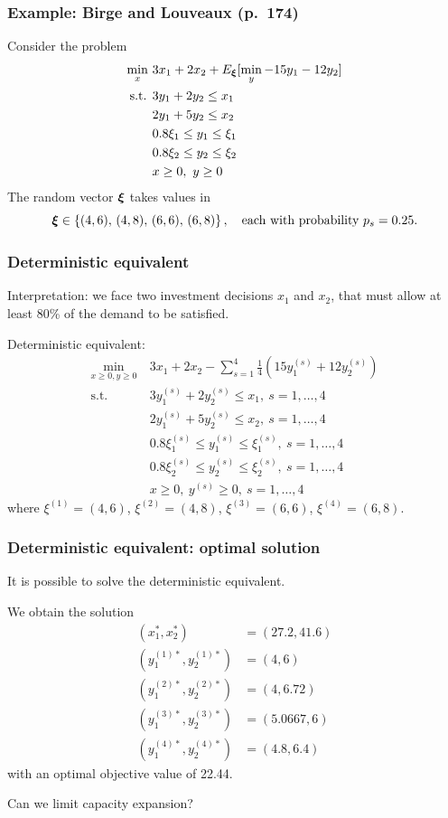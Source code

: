 \documentclass[aspectratio=169]{beamer}
\begin{document}
\begin{frame}
\frametitle{Example: Birge and Louveaux (p.~174)}

\small
Consider the problem
\begin{align*}
	\min_x\ & 3x_1 + 2x_2 + E_{{\boldsymbol{\xi}}}[\min_y -15y_1-12y_2] \\
	\text{s.t. } & 3y_1 + 2y_2 \leq x_1 \\
	& 2y_1 + 5y_2 \leq x_2 \\
	& 0.8 \xi_1 \leq y_1 \leq \xi_1 \\
	& 0.8 \xi_2 \leq y_2 \leq \xi_2 \\
	& x \geq 0,\ y \geq 0
\end{align*}
The random vector ${\boldsymbol{\xi}}$ takes values in
\[
{\boldsymbol{\xi}} \in \left\{ (4,6),\, (4,8),\, (6,6),\, (6,8) \right\}, \quad \text{each with probability } p_s = 0.25.
\]

\end{frame}

\begin{frame}
\frametitle{Deterministic equivalent}

\small
{\red Interpretation}: we face two investment decisions $x_1$ and $x_2$,
that must allow at least 80\% of the demand to be satisfied.

{\red Deterministic equivalent}:
\begin{align*}
\min_{x \geq 0, y \geq 0}\ & 3x_1 + 2x_2 - \sum_{s = 1}^4 \frac{1}{4} \left( 15y^{(s)}_1+12y^{(s)}_2 \right) \\
\text{s.t. } & 3y^{(s)}_1 + 2y^{(s)}_2 \leq x_1,\ s = 1,\ldots,4 \\
& 2y^{(s)}_1 + 5y^{(s)}_2 \leq x_2,\ s = 1,\ldots,4 \\
& 0.8 \xi^{(s)}_1 \leq y^{(s)}_1 \leq \xi^{(s)}_1,\ s = 1,\ldots,4 \\
& 0.8 \xi^{(s)}_2 \leq y^{(s)}_2 \leq \xi^{(s)}_2,\ s = 1,\ldots,4 \\
& x \geq 0,\ y^{(s)} \geq 0,\ s = 1,\ldots,4
\end{align*}
where $\xi^{(1)} = (4,6)$, $\xi^{(2)} = (4,8)$, $\xi^{(3)} = (6,6)$, $\xi^{(4)} = (6,8)$.

\end{frame}

\begin{frame}
\frametitle{Deterministic equivalent: optimal solution}

It is possible to solve the deterministic equivalent.

\mbox{}

We obtain the solution
\begin{align*}
(x_1^*, x_2^*) &= (27.2, 41.6) \\
\left(y^{(1)*}_1, y^{(1)*}_2\right) &= (4,6) \\
\left(y^{(2)*}_1, y^{(2)*}_2\right) &= (4,6.72) \\
\left(y^{(3)*}_1, y^{(3)*}_2\right) &= (5.0667,6) \\
\left(y^{(4)*}_1, y^{(4)*}_2\right) &= (4.8,6.4)
\end{align*}
with an optimal objective value of 22.44.

Can we limit capacity expansion?

\end{frame}
\end{document}
